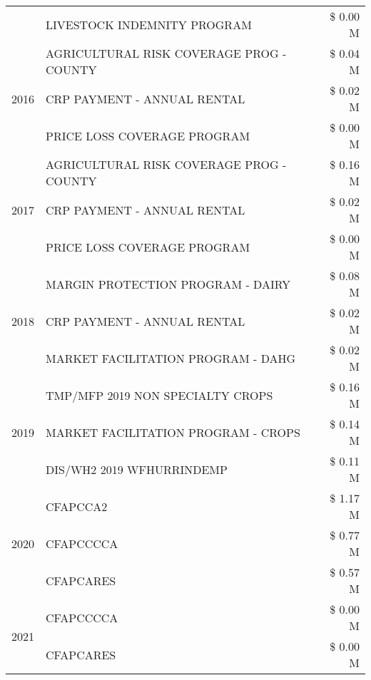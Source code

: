 \begin{tabular}{llr}
 & LIVESTOCK INDEMNITY PROGRAM & \$ 0.00 M \\
\cline{1-3}
\multirow[t]{3}{*}{2016} & AGRICULTURAL RISK COVERAGE PROG - COUNTY & \$ 0.04 M \\
 & CRP PAYMENT - ANNUAL RENTAL & \$ 0.02 M \\
 & PRICE LOSS COVERAGE PROGRAM & \$ 0.00 M \\
\cline{1-3}
\multirow[t]{3}{*}{2017} & AGRICULTURAL RISK COVERAGE PROG - COUNTY & \$ 0.16 M \\
 & CRP PAYMENT - ANNUAL RENTAL & \$ 0.02 M \\
 & PRICE LOSS COVERAGE PROGRAM & \$ 0.00 M \\
\cline{1-3}
\multirow[t]{3}{*}{2018} & MARGIN PROTECTION PROGRAM - DAIRY & \$ 0.08 M \\
 & CRP PAYMENT - ANNUAL RENTAL & \$ 0.02 M \\
 & MARKET FACILITATION PROGRAM - DAHG & \$ 0.02 M \\
\cline{1-3}
\multirow[t]{3}{*}{2019} & TMP/MFP 2019 NON SPECIALTY CROPS & \$ 0.16 M \\
 & MARKET FACILITATION PROGRAM - CROPS & \$ 0.14 M \\
 & DIS/WH2 2019 WFHURRINDEMP & \$ 0.11 M \\
\cline{1-3}
\multirow[t]{3}{*}{2020} & CFAPCCA2 & \$ 1.17 M \\
 & CFAPCCCCA & \$ 0.77 M \\
 & CFAPCARES & \$ 0.57 M \\
\cline{1-3}
\multirow[t]{2}{*}{2021} & CFAPCCCCA & \$ 0.00 M \\
 & CFAPCARES & \$ 0.00 M \\
\cline{1-3}
\bottomrule
\end{tabular}

